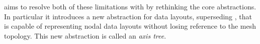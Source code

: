 \documentclass[thesis]{subfiles}
\begin{document}
 aims to resolve both of these limitations with  by rethinking the core abstractions.
In particular it introduces a new abstraction for data layouts, superseding , that is capable of representing nodal data layouts without losing reference to the mesh topology.
This new abstraction is called an \emph{axis tree}.
\end{document}
